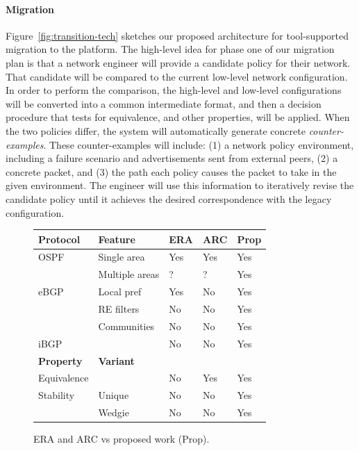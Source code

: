 \paragraph{Migration}  Figure~\ref{fig:transition-tech} sketches our proposed architecture for tool-supported migration 
to the \Name platform.  The high-level idea for phase one of our migration plan is that a network engineer will
provide a candidate \Name policy for their network.  That candidate will be compared to
the current low-level network configuration.  In order to perform the comparison, the
high-level and low-level configurations will be converted into a common 
intermediate format, and then a decision procedure that tests for equivalence, and other properties, will be applied.
When the two policies differ, the system will automatically generate
concrete \emph{counter-examples}.  These counter-examples will
include: (1) a network policy environment, including a failure scenario and advertisements
sent from external peers, (2) a concrete packet, and (3) the path each policy causes the packet to take in the given environment.
The engineer will use this information to iteratively revise the 
candidate \Name policy until it achieves the desired correspondence with the legacy configuration.  

\begin{figure}
  \centering
  \small
  \begin{tabular}{|l|l|l|l|l|}
\hline\hline
{\bf Protocol} & {\bf Feature} & {\bf ERA} & {\bf ARC} & {\bf Prop} \\\hline\hline
OSPF & Single area & Yes & Yes & Yes \\
& Multiple areas & ? & ? & Yes \\ \hline
eBGP  & Local pref & Yes & No & Yes \\
  & RE filters &  No & No & Yes \\
  & Communities & No & No & Yes \\\hline
iBGP & & No & No & Yes \\\hline
\hline
{\bf Property} & {\bf Variant} &  &  &  \\\hline\hline
Equivalence & & No & Yes & Yes\\\hline
Stability & Unique & No & No & Yes \\
 & Wedgie & No & No & Yes \\\hline
  \end{tabular}
\caption{ERA and ARC vs proposed work (Prop). }
\label{fig:smt-vs-arc}
\end{figure}

